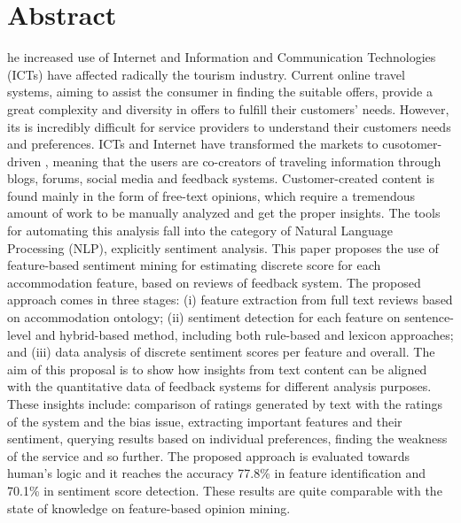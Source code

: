 %
%
%
\let\cleardoublepage\clearpage
\chapter{Abstract}
\begin{SingleSpace}

he increased use of Internet and Information and Communication Technologies (ICTs) have affected radically the tourism industry. Current online travel systems, aiming to assist the consumer in finding the suitable offers, provide a great complexity and diversity in offers to fulfill their customers' needs. However, its is incredibly\todo{} difficult for service providers to understand their customers needs and preferences. ICTs and Internet have transformed the markets to cusotomer-driven \cite{buhalis2011tourism}, meaning that the users are co-creators of traveling information through blogs, forums, social media and feedback systems.  Customer-created content is found mainly in the form of free-text opinions, which require a tremendous amount of work to be manually analyzed and get the proper insights. The tools for automating this analysis fall into the category of Natural Language Processing (NLP), explicitly sentiment analysis. 
This paper proposes the use of feature-based sentiment mining for estimating discrete score for each accommodation feature, based on reviews of feedback system. The proposed approach comes in three stages: (i) feature extraction from full text reviews based on accommodation ontology; (ii) sentiment detection for each feature on sentence-level and hybrid-based method, including both rule-based and lexicon approaches; and (iii) data analysis of discrete sentiment scores per feature and overall. The aim of this proposal is to show how insights from text content can be aligned with the quantitative data of feedback systems for different analysis purposes. These insights include: comparison of ratings generated by text with the ratings of the system and the bias issue, extracting important features and their sentiment, querying results based on individual preferences, finding the weakness of the service and so further. The proposed approach is evaluated towards human's logic and it reaches the accuracy 77.8\% in feature identification and 70.1\% in sentiment score detection. These results are quite comparable with the state of knowledge on feature-based opinion mining.
\end{SingleSpace}
\clearpage